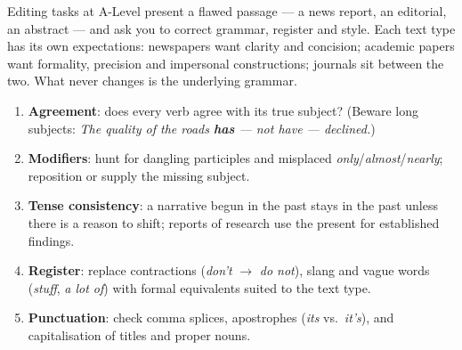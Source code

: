 \documentclass[11pt]{article}
\begin{document}
Editing tasks at A-Level present a flawed passage — a news report, an editorial, an abstract — and ask you to correct grammar, register and style. Each text type has its own expectations: newspapers want clarity and concision; academic papers want formality, precision and impersonal constructions; journals sit between the two. What never changes is the underlying grammar.

\begin{methode}
\begin{enumerate}
\item \textbf{Agreement}: does every verb agree with its true subject? (Beware long subjects: \emph{The quality of the roads \textbf{has} — not \emph{have} — declined.})
\item \textbf{Modifiers}: hunt for dangling participles and misplaced \emph{only}/\emph{almost}/\emph{nearly}; reposition or supply the missing subject.
\item \textbf{Tense consistency}: a narrative begun in the past stays in the past unless there is a reason to shift; reports of research use the present for established findings.
\item \textbf{Register}: replace contractions (\emph{don't} $\rightarrow$ \emph{do not}), slang and vague words (\emph{stuff}, \emph{a lot of}) with formal equivalents suited to the text type.
\item \textbf{Punctuation}: check comma splices, apostrophes (\emph{its} vs.\ \emph{it's}), and capitalisation of titles and proper nouns.
\end{enumerate}
\end{methode}
\end{document}
